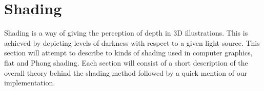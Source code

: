 \section{Shading}

Shading is a way of giving the perception of depth in 3D illustrations.
This is achieved by depicting levels of darkness with respect to a given
light source. This section will attempt to describe to kinds of shading used
in computer graphics, flat and Phong shading. Each section will consist of a
short description of the overall theory behind the shading method followed by a
quick mention of our implementation.





